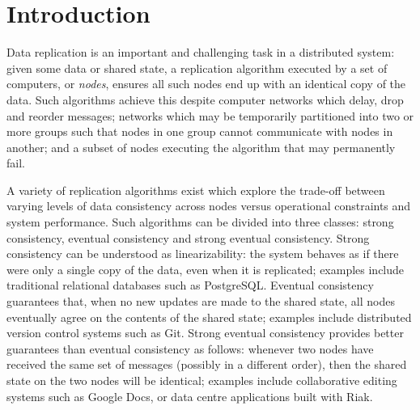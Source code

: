 \documentclass[acmlarge,review,anonymous]{acmart}\settopmatter{printfolios=true}
\begin{document}


\maketitle



\section{Introduction}
\label{sect.introduction}

Data replication is an important and challenging task in a distributed system: given some data or shared state, a replication algorithm executed by a set of computers, or \emph{nodes}, ensures all such nodes end up with an identical copy of the data.
Such algorithms achieve this despite computer networks which delay, drop and reorder messages; networks which may be temporarily partitioned into two or more groups such that nodes in one group cannot communicate with nodes in another; and a subset of nodes executing the algorithm that may permanently fail.

A variety of replication algorithms exist which explore the trade-off between varying levels of data consistency across nodes versus operational constraints and system performance.
Such algorithms can be divided into three classes: strong consistency, eventual consistency and strong eventual consistency.
Strong consistency can be understood as linearizability: the system behaves as if there were only a single copy of the data, even when it is replicated; examples include traditional relational databases such as PostgreSQL.
Eventual consistency guarantees that, when no new updates are made to the shared state, all nodes eventually agree on the contents of the shared state; examples include distributed version control systems such as Git.
Strong eventual consistency provides better guarantees than eventual consistency as follows: whenever two nodes have received the same set of messages (possibly in a different order), then the shared state on the two nodes will be identical; examples include collaborative editing systems such as Google Docs, or data centre applications built with Riak.
\end{document}
